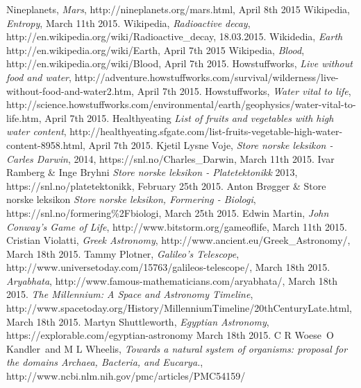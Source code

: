 \begin{thebibliography}{99}
		Nineplanets,
		\emph{Mars},
		http://nineplanets.org/mars.html,
		April 8th 2015
		Wikipedia,
		\emph{Entropy},
		March 11th 2015.
		Wikipedia,
		\emph{Radioactive decay},
		http://en.wikipedia.org/wiki/Radioactive\_decay,
		18.03.2015.
		Wikidedia,
		\emph{Earth}
		http://en.wikipedia.org/wiki/Earth,
		April 7th 2015
		Wikipedia,
		\emph{Blood},
		http://en.wikipedia.org/wiki/Blood,
		April 7th 2015.
		Howstuffworks,
		\emph{Live without food and water},
		http://adventure.howstuffworks.com/survival/wilderness/live-without-food-and-water2.htm,
		April 7th 2015.
		Howstuffworks,
		\emph{Water vital to life},
		http://science.howstuffworks.com/environmental/earth/geophysics/water-vital-to-life.htm,
		April 7th 2015.
		Healthyeating
		\emph{List of fruits and vegetables with high water content},
		http://healthyeating.sfgate.com/list-fruits-vegetable-high-water-content-8958.html,
		April 7th 2015.
		Kjetil Lysne Voje,
		\emph{Store norske leksikon - Carles Darwin},
		2014,
		https://snl.no/Charles\_Darwin,
		March 11th 2015.
		Ivar Ramberg \& Inge Bryhni
		\emph{Store norske leksikon - Platetektonikk}
		2013,
		https://snl.no/platetektonikk,
		February 25th 2015.
		Anton Brøgger \& Store norske leksikon
		\emph{Store norske leksikon, Formering - Biologi},
		https://snl.no/formering\%2Fbiologi,
		March 25th 2015.
		Edwin Martin,
		\emph{John Conway's Game of Life},
		http://www.bitstorm.org/gameoflife,
		March 11th 2015.
		Cristian Violatti,
		\emph{Greek Astronomy},
		http://www.ancient.eu/Greek\_Astronomy/,
		March 18th 2015.
		Tammy Plotner,
		\emph{Galileo's Telescope},
		http://www.universetoday.com/15763/galileos-telescope/,
		March 18th 2015.
		\emph{Aryabhata},
		http://www.famous-mathematicians.com/aryabhata/,
		March 18th 2015.
		\emph{The Millennium: A Space and Astronomy Timeline},
		http://www.spacetoday.org/History/MillenniumTimeline/20thCenturyLate.html,
		March 18th 2015.
		Martyn Shuttleworth,
		\emph{Egyptian Astronomy},
		https://explorable.com/egyptian-astronomy
		March 18th 2015.
		C R Woese\, O Kandler\, and M L Wheelis,
		\emph{Towards a natural system of organisms: proposal for the domains Archaea, Bacteria, and Eucarya.},
		http://www.ncbi.nlm.nih.gov/pmc/articles/PMC54159/

\end{thebibliography}
